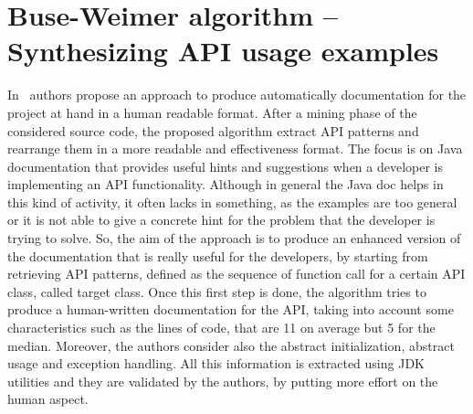 \section{Buse-Weimer algorithm -- 
Synthesizing API usage examples}

In~\cite{buse_synthesizing_2012} authors 
propose an approach to produce 
automatically documentation for the project 
at hand in a human readable format.
After a mining phase of the considered 
source code, the proposed algorithm 
extract API patterns and rearrange them in 
a more readable and effectiveness 
format. The focus is on Java documentation 
that provides useful hints and 
suggestions when a developer is 
implementing an API functionality. Although 
in 
general the Java doc helps in this kind of 
activity, it often lacks in 
something, as the examples are too general 
or it is not able to give a concrete 
hint for the problem that the developer is 
trying to solve. So, the aim of the 
approach is to produce an enhanced version 
of the documentation that is really 
useful for the developers, by starting from 
retrieving API patterns, defined as 
the sequence of function call for a certain 
API class, called target class. 
Once this first step is done, the algorithm 
tries to produce a human-written 
documentation for the API, taking into 
account some characteristics such as the 
lines of code, that are 11 on average but 5 
for the median. Moreover, the 
authors consider also the abstract 
initialization, abstract usage and 
exception 
handling. All this information is extracted 
using JDK utilities and they are 
validated by the authors, by putting more 
effort on the human aspect. 

